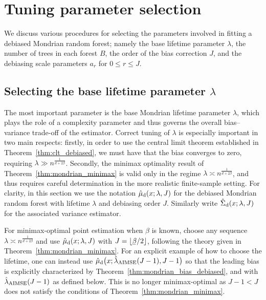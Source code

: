 \section{Tuning parameter selection}%
\label{sec:parameter_selection}

We discuss various procedures for selecting the parameters involved in fitting
a debiased Mondrian random forest; namely the base lifetime parameter
$\lambda$, the number of trees in each forest $B$, the order of the bias
correction $J$, and the debiasing scale parameters $a_r$ for $0 \leq r \leq J$.

\subsection{Selecting the base lifetime parameter
\texorpdfstring{$\lambda$}{lambda}}%
\label{sec:lifetime_selection}

The most important parameter is the base Mondrian lifetime parameter $\lambda$,
which plays the role of a complexity parameter and thus governs the overall
bias--variance trade-off of the estimator. Correct tuning of $\lambda$ is
especially important in two main respects:
%
firstly, in order to use the central limit theorem established in
Theorem~\ref{thm:clt_debiased}, we must have that the bias converges to zero,
requiring $\lambda \gg n^{\frac{1}{d + 2\beta}}$.
%
Secondly, the minimax optimality result of Theorem~\ref{thm:mondrian_minimax}
is valid only in the regime $\lambda \asymp n^{\frac{1}{d + 2\beta}}$, and thus
requires careful determination in the more realistic finite-sample setting. For
clarity, in this section we use the notation $\hat\mu_{\mathrm{d}}(x; \lambda, J)$ for
the debiased Mondrian random forest with lifetime $\lambda$ and debiasing order
$J$. Similarly write $\hat\Sigma_{\mathrm{d}}(x; \lambda, J)$ for the associated
variance estimator.

For minimax-optimal point estimation when $\beta$ is known,
choose any sequence $\lambda \asymp n^{\frac{1}{d + 2\beta}}$
and use $\hat\mu_{\mathrm{d}}(x; \lambda, J)$ with $J = \lfloor \flbeta / 2 \rfloor$,
following the theory given in Theorem~\ref{thm:mondrian_minimax}.
For an explicit example of how to choose the lifetime, one can instead use
$\hat\mu_{\mathrm{d}}\big(x; \hat\lambda_{\operatorname{AIMSE}}(J-1), J-1\big)$
so that the leading bias is explicitly characterized by
Theorem~\ref{thm:mondrian_bias_debiased},
and with $\hat\lambda_{\operatorname{AIMSE}}(J-1)$ as defined below.
This is no longer minimax-optimal as $J-1 < J$
does not satisfy the conditions of Theorem~\ref{thm:mondrian_minimax}.

